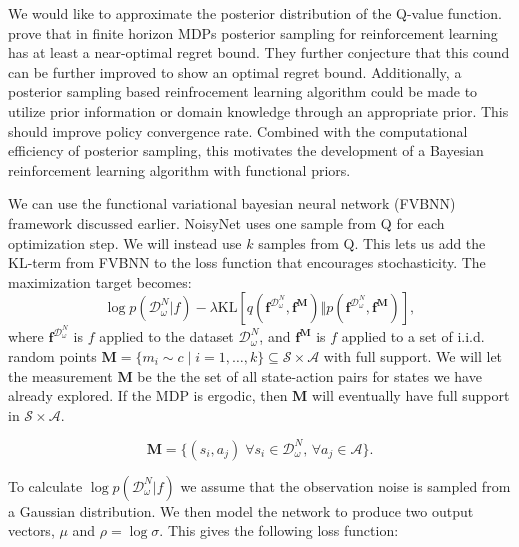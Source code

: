 \documentclass[]{uai2021} %
\newcommand{\D}{\mathcal{D}}
\newcommand{\f}{\mathbf{f}}
\newcommand{\state}{\mathcal{S}}
\newcommand{\action}{\mathcal{A}}
\newcommand{\KL}{\mathrm{KL}}
\begin{document}

We would like to approximate the posterior distribution of the Q-value function.
\citet{osband_why_2017} prove that in finite horizon MDPs posterior sampling for
reinforcement learning has at least a near-optimal regret bound. They further conjecture
that this cound can be further improved to show an optimal regret bound. Additionally,
a posterior sampling based reinfrocement learning algorithm could be made to utilize
prior information or domain knowledge through an appropriate prior. This should improve
policy convergence rate.
Combined with the computational efficiency of posterior sampling, this motivates the
development of a Bayesian reinforcement learning algorithm with functional priors.

We can use the functional variational bayesian neural
network (FVBNN)~\citep{sun_functional_2019} framework discussed earlier.
NoisyNet uses one sample from Q for each optimization step. We will instead use
\(k\) samples from Q. This lets us add the KL-term from FVBNN to the loss function that
encourages stochasticity.
The maximization target becomes:
\begin{equation}
    \log p(\D_\omega^N \vert f) - \lambda \KL \left[ q(\f^{\D_\omega^N}, \f^\mathbf{M}) \Vert p(\f^{\D_\omega^N}, \f^\mathbf{M}) \right],
\end{equation}
where \(\f^{\D_\omega^N}\) is \(f\) applied to the dataset \(\D_\omega^N\), and \(\f^\mathbf{M}\) is \(f\) applied to
a set of i.i.d. random points \(\mathbf{M} = \{m_i \sim c \mid i=1,\dots,k\} \subseteq \state \times \action\)
with full support. We will let the measurement \(\mathbf{M}\) be the the set of all state-action
pairs for states we have already explored. If the MDP is ergodic, then \(\textbf{M}\) will eventually
have full support in \(\state \times \action\).

\begin{equation}
    \mathbf{M} = \{(s_i, a_j) \; \forall s_i \in \D_\omega^N,\, \forall a_j \in \action\}. 
\end{equation}

To calculate \(\log p(\D_\omega^N \vert f)\) we assume that the observation noise is sampled
from a Gaussian distribution. We then model the network to produce two output vectors,
\(\mu\) and \(\rho = \log \sigma\). This gives the following loss function:
\end{document}
